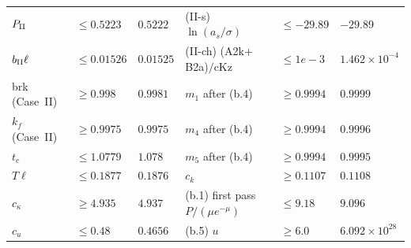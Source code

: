 \begin{table}
\begin{ruledtabular}
\begin{tabular}{p{}p{}p{}p{}p{}p{}}
$P_{\rm II}$ & $\le 0.5223$ & $0.5222$ & (II-s) $\ln(a_s/\sigma)$ & $\le -29.89$ & $-29.89$\\
$b_{\rm II}\ell$ & $\le 0.01526$ & $0.01525$ & (II-ch) (A2k$+$B2a)$/$cKz & $\le 1e-3$ & $1.462\times10^{-4}$\\
brk (Case~II) & $\ge 0.998$ & $0.9981$ & $m_1$ after (b.4) & $\ge 0.9994$ & $0.9999$\\
$k_f$ (Case~II) & $\ge 0.9975$ & $0.9975$ & $m_4$ after (b.4) & $\ge 0.9994$ & $0.9996$\\
$t_c$ & $\le 1.0779$ & $1.078$ & $m_5$ after (b.4) & $\ge 0.9994$ & $0.9995$\\
$T\ell$ & $\le 0.1877$ & $0.1876$ & $c_k$ & $\ge 0.1107$ & $0.1108$\\
$c_\kappa$ & $\ge 4.935$ & $4.937$ & (b.1) first pass $P/(\mu e^{-\mu})$ & $\le 9.18$ & $9.096$\\
$c_u$ & $\le 0.48$ & $0.4656$ & (b.5) $u$ & $\ge 6.0$ & $6.092\times10^{28}$\\
\end{tabular}
\end{ruledtabular}
\end{table}
